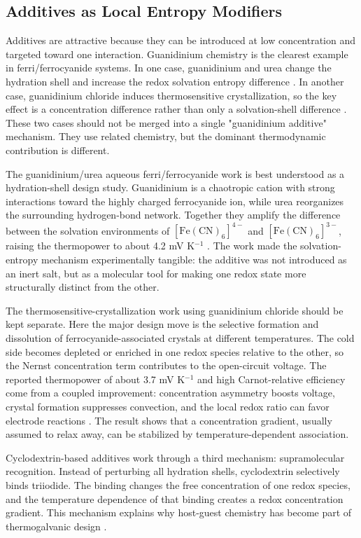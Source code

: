 \documentclass[a4paper,12pt]{report}
\begin{document}
\subsection{Additives as Local Entropy Modifiers}

Additives are attractive because they can be introduced at low concentration
and targeted toward one interaction. Guanidinium chemistry is the clearest
example in ferri/ferrocyanide systems. In one case, guanidinium and urea
change the hydration shell and increase the redox solvation entropy difference
\citep{duan2018aqueous}. In another case, guanidinium chloride induces
thermosensitive crystallization, so the key effect is a concentration
difference rather than only a solvation-shell difference
\citep{yu2020thermosensitive}. These two cases should not be merged into a
single "guanidinium additive" mechanism. They use related chemistry, but the
dominant thermodynamic contribution is different.

The guanidinium/urea aqueous ferri/ferrocyanide work is best understood as a
hydration-shell design study. Guanidinium is a chaotropic cation with strong
interactions toward the highly charged ferrocyanide ion, while urea reorganizes
the surrounding hydrogen-bond network. Together they amplify the difference
between the solvation environments of $[\mathrm{Fe(CN)}_6]^{4-}$ and
$[\mathrm{Fe(CN)}_6]^{3-}$, raising the thermopower to about 4.2 mV K$^{-1}$
\citep{duan2018aqueous}. The work made the
solvation-entropy mechanism experimentally tangible: the additive was not
introduced as an inert salt, but as a molecular tool for making one redox state
more structurally distinct from the other.

The thermosensitive-crystallization work using guanidinium chloride should be
kept separate. Here the major design move is the selective formation and
dissolution of ferrocyanide-associated crystals at different temperatures. The
cold side becomes depleted or enriched in one redox species relative to the
other, so the Nernst concentration term contributes to the open-circuit
voltage. The reported thermopower of about 3.7 mV K$^{-1}$ and high
Carnot-relative efficiency come from a coupled improvement: concentration
asymmetry boosts voltage, crystal formation suppresses convection, and the
local redox ratio can favor electrode reactions \citep{yu2020thermosensitive}.
The result shows that a concentration gradient, usually assumed to relax away,
can be stabilized by temperature-dependent association.

Cyclodextrin-based additives work through a third mechanism: supramolecular
recognition. Instead of perturbing all hydration shells, cyclodextrin
selectively binds triiodide. The binding changes the free concentration of one
redox species, and the temperature dependence of that binding creates a redox
concentration gradient. This mechanism explains why host-guest chemistry has
become part of thermogalvanic design
\citep{zhou2016supramolecular}.
\end{document}
